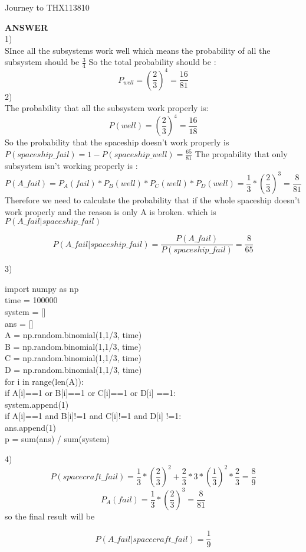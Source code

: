 \begin{questions}
\begin{question}{Journey to THX1138}{10}
	
\begin{answer}
\textbf{ANSWER}\\
1)\\
SInce all the subsystems work well which means the probability of all the subsystem should be $\frac{3}{4}$ So the total probability should be :
$$P_{well} = (\frac{2}{3})^4 = \frac{16}{81}$$
2)\\
The probability that all the subsystem work properly is:
$$P(well) = (\frac{2}{3})^4 = \frac{16}{18}$$
So the probability that the spaceship doesn't work properly is $P(spaceship\_fail) = 1-P(spaceship\_well) = \frac{65}{81}$
The propability that only subsystem isn't working properly is :
$$P(A\_fail) = P_A(fail) * P_B(well) * P_C(well) * P_D(well) = \frac{1}{3}* (\frac{2}{3})^3 = \frac{8}{81}$$
Therefore we need to calculate the probability that if the whole spaceship doesn't work properly and the reason is only A is broken. which is $P(A\_fail | spaceship\_fail)$

$$P(A\_fail | spaceship\_fail) = \frac{P(A\_fail)}{P(spaceship\_fail)} = \frac{8}{65}$$

3)\\
\begin{code}
import numpy as np \\
time = 100000\\
system = []\\
ans = []\\
A = np.random.binomial(1,1/3, time)\\
B = np.random.binomial(1,1/3, time)\\
C = np.random.binomial(1,1/3, time)\\
D = np.random.binomial(1,1/3, time)\\
for i in range(len(A)):\\
    if A[i]==1 or B[i]==1 or C[i]==1 or D[i] ==1:\\
        system.append(1)\\
    if A[i]==1 and B[i]!=1 and C[i]!=1 and D[i] !=1:\\
        ans.append(1)\\
p = sum(ans) / sum(system)\\
\end{code}

4)\\
$$P(spacecraft\_fail) = \frac{1}{3}*(\frac{2}{3})^2 + \frac{2}{3}* 3*(\frac{1}{3})^2*\frac{2}{3}= \frac{8}{9}$$
$$P_A(fail) = \frac{1}{3}*(\frac{2}{3})^3 = \frac{8}{81}$$
so the final result will be 

$$P(A\_fail | spacecraft\_fail) =\frac{1}{9} $$

\end{answer}
	
\end{question}


\end{questions}
